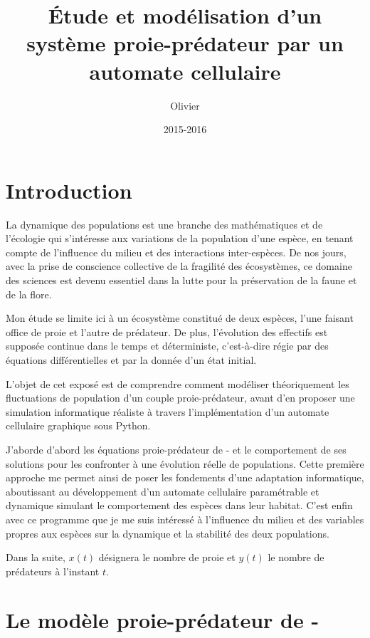 \documentclass[11pt]{article}
\title{Étude et modélisation d'un système proie-prédateur par un automate cellulaire}
\author{Olivier \bsc{Roques}}
\date{2015-2016}
\begin{document}
\maketitle

\renewcommand{\contentsname}{Sommaire}
\tableofcontents
\newpage

\section{Introduction}

La dynamique des populations est une branche des mathématiques et de l'écologie qui s'intéresse aux variations de la population d'une espèce, en tenant compte de l'influence du milieu et des interactions inter-espèces. De nos jours, avec la prise de conscience collective de la fragilité des écosystèmes, ce domaine des sciences est devenu essentiel dans la lutte pour la préservation de la faune et de la flore.

Mon étude se limite ici à un écosystème constitué de deux espèces, l'une faisant office de proie et l'autre de prédateur. De plus, l'évolution des effectifs est supposée continue dans le temps et déterministe, c'est-à-dire régie par des équations différentielles et par la donnée d'un état initial.

L'objet de cet exposé est de comprendre comment modéliser théoriquement les fluctuations de population d'un couple proie-prédateur, avant d'en proposer une simulation informatique réaliste à travers l'implémentation d'un automate cellulaire graphique sous Python.

J'aborde d'abord les équations proie-prédateur de - et le comportement de ses solutions pour les confronter à une évolution réelle de populations. Cette première approche me permet ainsi de poser les fondements d'une adaptation informatique, aboutissant au développement d'un automate cellulaire paramétrable et dynamique simulant le comportement des espèces dans leur habitat. C'est enfin avec ce programme que je me suis intéressé à l'influence du milieu et des variables propres aux espèces sur la dynamique et la stabilité des deux populations.

Dans la suite, $x(t)$ désignera le nombre de proie et $y(t)$ le nombre de prédateurs à l'instant $t$.

\section{Le modèle proie-prédateur de -}
\end{document}
